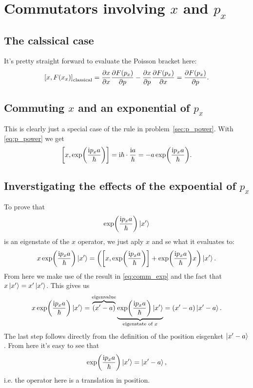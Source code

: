 \documentclass[11pt,letter, swedish, english
]{article}
\begin{document}
\section{Commutators involving $x$ and $p_x$}

\subsection{The calssical case}
It's pretty straight forward to evaluate the Poisson bracket here:
\begin{equation}
\comm{x}{F(x_x)}_\text{classical} 
= \pdv{x}{x}\pdv{F(p_x)}{p} - \pdv{x}{p}\pdv{F(p_x)}{x} 
= \pdv{F(p_x)}{p}.
\end{equation}

\subsection{Commuting $x$ and an exponential of $p_x$}
This is clearly just a special case of the rule in
problem~\ref{sec:p_power}. With \eqref{eq:p_power} we get
\begin{equation} \label{eq:comm_exp}
\comm{x}{\exp(\frac{\ii p_xa}{\hbar})} 
= \ii\hbar \cdot \frac{\ii a}{\hbar} = -a \exp(\frac{\ii p_xa}{\hbar}).
\end{equation}

\subsection{Inverstigating the effects of the expoential of $p_x$}\label{sec:3c}
To prove that
\begin{equation}
\exp(\frac{\mathrm{i} p_xa}{\hbar})\ket{x'}
\end{equation}
is an eigenstate of the $x$ operator, we just aply $x$ and se what it
evaluates to:
\begin{equation}
x\exp(\frac{\ii p_xa}{\hbar})\ket{x'} 
= \left( \comm{x}{\exp(\frac{\ii p_xa}{\hbar})} 
+\exp(\frac{\ii p_xa}{\hbar}) x \right)\ket{x'}.
\end{equation}
From here we make use of the result in \eqref{eq:comm_exp} and the
fact that $x\ket{x'}=x'\ket{x'}$. This gives us
\begin{equation}\label{eq:3_exp_p}
x\exp(\frac{\mathrm{i} p_xa}{\hbar})\ket{x'} 
= \overbrace{(x'-a)}^\text{eigenvalue}
  \underbrace{\exp(\frac{\mathrm{i} p_xa}{\hbar})\ket{x'}}_\text{eigenstate of $x$}
= (x'-a)\ket{x'-a}.
\end{equation}
The last step follows directly from the definition of the position
eisgenket $\ket{x'-a}$. From here it's easy to see that
\begin{equation}
\exp(\frac{\mathrm{i} p_xa}{\hbar})\ket{x'} = \ket{x'-a},
\end{equation}
i.e. the operator here is a translation in position.
\end{document}
